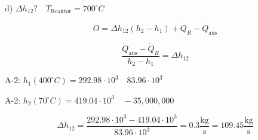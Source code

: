 d) $\Delta h_{12}? \quad T_{\text{Reaktor}} = 700^\circ C$

\[
O = \Delta h_{12} (h_2 - h_1) + \dot{Q}_{R} - \dot{Q}_{\text{aus}}
\]

\[
\frac{\dot{Q}_{\text{aus}} - \dot{Q}_{R}}{h_2 - h_1} = \Delta h_{12}
\]

A-2: $h_1 (400^\circ C) = 292.98 \cdot 10^3 \quad 83.96 \cdot 10^3$

A-2: $h_2 (70^\circ C) = 419.04 \cdot 10^3 \quad -35,000,000$

\[
\Delta h_{12} = \frac{292.98 \cdot 10^3 - 419.04 \cdot 10^3}{83.96 \cdot 10^3} = 0.3 \frac{\text{kg}}{\text{s}} = 109.45 \frac{\text{kg}}{\text{s}}
\]